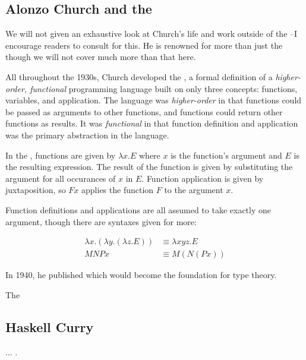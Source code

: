 \subsection{Alonzo Church and the \Lambdacalc{}}

We will not given an exhaustive look at Church's life and work outside of the
\lambdacalc{}--I encourage readers to consult 
for this.
He is renowned for more than just the \lambdacalc{} though we will not cover much more
than that here.

All throughout the 1930s, Church developed the \textit{\lambdacalc{}},
a formal definition of a \textit{higher-order, functional} programming language
built on only three concepts: functions, variables, and application.
The language was \textit{higher-order} in that functions could be passed
as arguments to other functions, and functions could return other functions as results.
It was \textit{functional} in that function definition and application was the
primary abstraction in the language.

In the \lambdacalc{}, functions are given by $\lambda x. E$ where $x$ is the function's argument
and $E$ is the resulting expression. The result of the function is given by substituting the
argument for all occurances of $x$ in $E$. Function application is given by juxtaposition,
so $F x$ applies the function $F$ to the argument $x$.

Function definitions and applications are all assumed to take exactly one argument,
though there are syntaxes given for more:

\begin{align}
	\lambda x . (\lambda y . (\lambda z . E)) & \equiv \lambda x y z . E
	\tag{function definition}
	\\
	M N P x                                   & \equiv M (N (P x))
	\tag{function application}
\end{align}

In 1940, he published 
which would become the foundation for type theory.

The \lambdacalc{}

\subsection{Haskell Curry}

...
.
